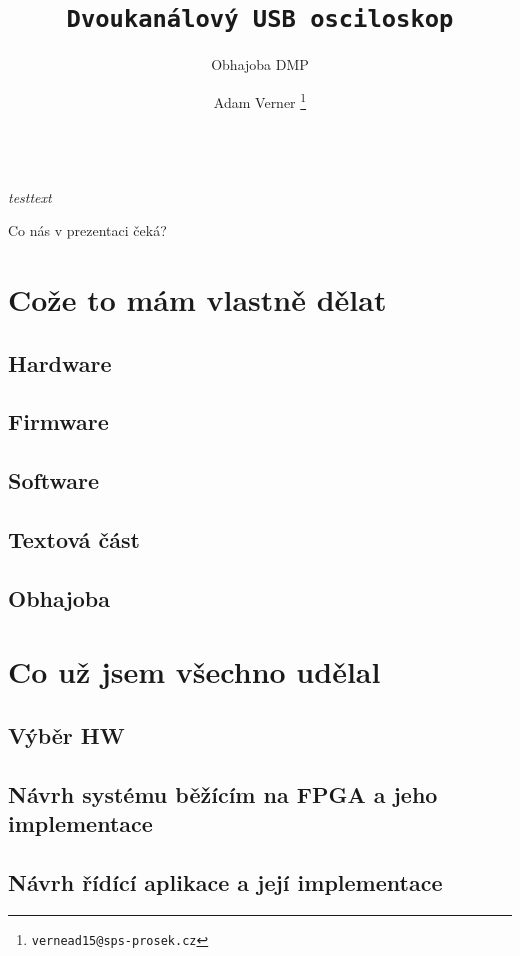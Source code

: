 \documentclass{beamer}
\title{\texttt{\LARGE Dvoukanálový USB osciloskop}}
\subtitle{ Obhajoba DMP }
\author{ Adam Verner \footnote{\texttt{vernead15@sps-prosek.cz}}}
\begin{document}
\begin{frame}
  \maketitle \\
  \textit{testtext}
\end{frame}

\begin{frame}{Co nás v prezentaci čeká?}
  \tableofcontents
\end{frame}

\section{Cože to mám vlastně dělat}

\localtableofcontents

\subsection{Hardware}
\subsection{Firmware}
\subsection{Software}
\subsection{Textová část}
\subsection{Obhajoba}  %


\section{Co už jsem všechno udělal}
\localtableofcontents
\subsection{Výběr HW}
\subsection{Návrh systému běžícím na FPGA a jeho implementace}
\subsection{Návrh řídící aplikace a její implementace}
\end{document}
